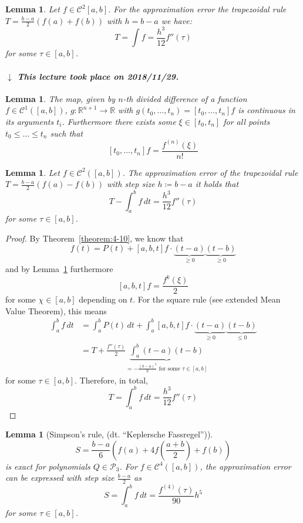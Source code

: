 \documentclass[a4paper]{article}
\newcounter{lecref}[section]
\numberwithin{lecref}{section}
\theoremstyle{break}
\newtheorem{lemma}[lecref]{Lemma}
\newtheorem*{Lemma}{Lemma}
\newcommand{\dateref}[1]{%
  \begin{mdframed}[backgroundcolor=gray!10,innerbottommargin=0pt,innertopmargin=0pt]
    \paragraph{\textit{$\downarrow$ This lecture took place on #1.}}%
  \end{mdframed}%
}
\newcommand{\dt}[1]{(dt. \enquote{\foreignlanguage{german}{#1}})}
\begin{document}
\begin{Lemma}
  Let $f \in \mathcal C^2[a, b]$.
  For the approximation error the trapezoidal rule $T = \frac{b-a}{2} (f(a) + f(b))$ with $h = b - a$ we have:
  \[ T = \int f = \frac{h^3}{12} f''(\tau) \]
  for some $\tau \in [a, b]$.
\end{Lemma}

\dateref{2018/11/29}

\begin{lemma}
  \label{lemma:5-6}
  The map, given by $n$-th divided difference of a function $f \in \mathcal C^1([a, b])$, $g: \mathbb R^{n + 1} \to \mathbb R$ with $g(t_0, \dots, t_n) = [t_0, \dots, t_n] f$ is continuous in its arguments $t_i$. Furthermore there exists some $\xi \in [t_0, t_n]$ for all points $t_0 \leq \dots \leq t_n$ such that
  \[ [t_0, \dots, t_n] f = \frac{f^{(n)}(\xi)}{n!} \]
\end{lemma}

\begin{lemma}
  \label{lemma:5-7}
  Let $f \in \mathcal C^2([a,b])$. The approximation error of the trapezoidal rule $T = \frac{b - a}{2} (f(a) - f(b))$ with step size $h \coloneqq b - a$ it holds that
  \[ T - \int_a^b f \, dt = \frac{h^3}{12} f''(\tau) \]
  for some $\tau \in [a,b]$.
\end{lemma}

\begin{proof}
  By Theorem~\ref{theorem:4-10}, we know that
  \[ f(t) = P(t) + [a, b, t] f \cdot \underbrace{(t - a)}_{\geq 0} \underbrace{(t - b)}_{\geq 0} \]
  and by Lemma~\ref{lemma:5-6} furthermore
  \[ [a,b,t] f = \frac{f^k(\xi)}{2} \]
  for some $\chi \in [a,b]$ depending on $t$.
  For the square rule (see extended Mean Value Theorem), this means
  \begin{align*}
    \int_a^b f \, dt
      &= \int_a^b P(t) \, dt + \int_a^b [a, b, t] f \cdot \underbrace{(t - a)}_{\geq 0} \underbrace{(t - b)}_{\leq 0} \\
      &= T + \frac{f''(\tau)}{2} \underbrace{\int_a^b (t - a) (t - b)}_{= -\frac{(b - a)^3}{6} \text{ for some } \tau \in [a,b]}
  \end{align*}
  for some $\tau \in [a,b]$. Therefore, in total,
  \[ T = \int_a^b f \, dt = \frac{h^3}{12} f''(\tau) \]
\end{proof}

\begin{lemma}[Simpson's rule, \dt{Keplersche Fassregel}]
  \label{lemma:5-8}
  \[ S = \frac{b - a}{6} (f(a) + 4f\left(\frac{a + b}{2}\right) + f(b)) \]
  is exact for polynomials $Q \in \mathcal P_3$.
  For $f \in \mathcal C^4([a,b])$, the approximation error can be expressed with step size $\frac{b - a}{2}$ as
  \[ S = \int_a^b f \, dt = \frac{f^{(4)}(\tau)}{90} h^5 \]
  for some $\tau \in [a,b]$.
\end{lemma}
\end{document}
